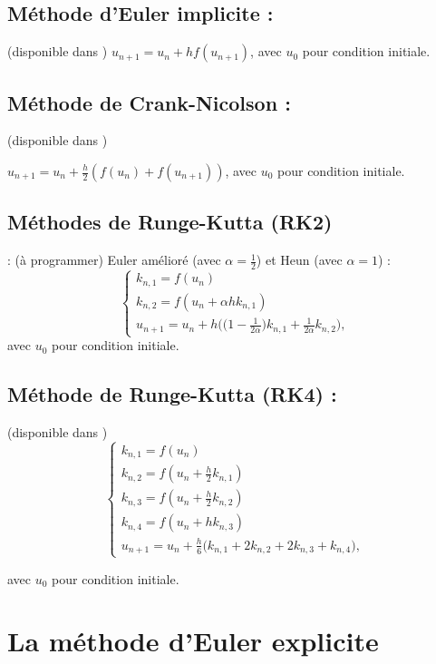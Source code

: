 \documentclass[a4paper,12pt,reqno]{amsart}
\begin{document}
\subsection*{Méthode d'Euler implicite :} (disponible dans )\newline
$ u_{n+1}=u_n+h f(u_{n+1})$, avec $u_0$ pour condition initiale.

\subsection*{Méthode de Crank-Nicolson :} (disponible dans )\newline
\smallskip
\centerline{$
u_{n+1}=u_n+\frac{h}{2}  (f(u_n)+f(u_{n+1}))$, avec $u_0$ pour condition initiale.}

\subsection*{Méthodes de Runge-Kutta (RK2)} : (à programmer)\newline
Euler amélioré (avec $\alpha = \frac{1}{2}$) et Heun (avec $\alpha=1$) :
$$
  \begin{cases}
    k_{n,1}=f(u_n)\\
    k_{n,2}=f(u_n+\alpha h k_{n,1})\\
    u_{n+1}=u_n+h \bigl( \bigl(1 - \frac{1}{2\alpha}\bigl) k_{n,1}+\frac{1}{2\alpha}k_{n,2}\bigl),
  \end{cases}
$$
avec $u_0$ pour condition initiale.

\subsection*{Méthode de Runge-Kutta (RK4) :} (disponible dans )\newline
$$
  \begin{cases}
    k_{n,1}=f(u_n)\\
    k_{n,2}=f(u_n+\frac{h}{2}k_{n,1})\\[0.2cm]
    k_{n,3}=f(u_n+\frac{h}{2} k_{n,2})\\[0.2cm]
    k_{n,4}=f(u_n+h k_{n,3})\\[0.2cm]
    u_{n+1}=u_n+\frac{h}{6}\bigl( k_{n,1}+2 k_{n,2}+2 k_{n,3}+k_{n,4}\bigl),
  \end{cases}
$$

avec $u_0$ pour condition initiale.

\section{La méthode d'Euler explicite }
\end{document}

